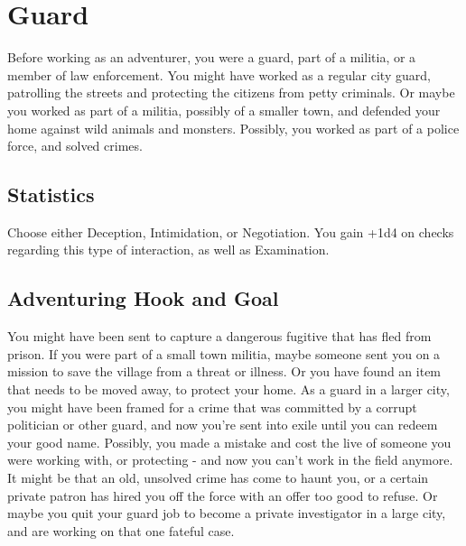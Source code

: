\section{Guard}\label{background:guard}
Before working as an adventurer, you were a guard, part of a militia, or a member of law enforcement.
You might have worked as a regular city guard, patrolling the streets and protecting the citizens from petty criminals.
Or maybe you worked as part of a militia, possibly of a smaller town, and defended your home against wild animals and monsters.
Possibly, you worked as part of a police force, and solved crimes.

\subsection{Statistics}
Choose either Deception, Intimidation, or Negotiation.
You gain +1d4 on checks regarding this type of interaction, as well as Examination.

\subsection{Adventuring Hook and Goal}
You might have been sent to capture a dangerous fugitive that has fled from prison.
If you were part of a small town militia, maybe someone sent you on a mission to save the village from a threat or illness.
Or you have found an item that needs to be moved away, to protect your home.
As a guard in a larger city, you might have been framed for a crime that was committed by a corrupt politician or other guard, and now you're sent into exile until you can redeem your good name.
Possibly, you made a mistake and cost the live of someone you were working with, or protecting - and now you can't work in the field anymore.
It might be that an old, unsolved crime has come to haunt you, or a certain private patron has hired you off the force with an offer too good to refuse.
Or maybe you quit your guard job to become a private investigator in a large city, and are working on that one fateful case.